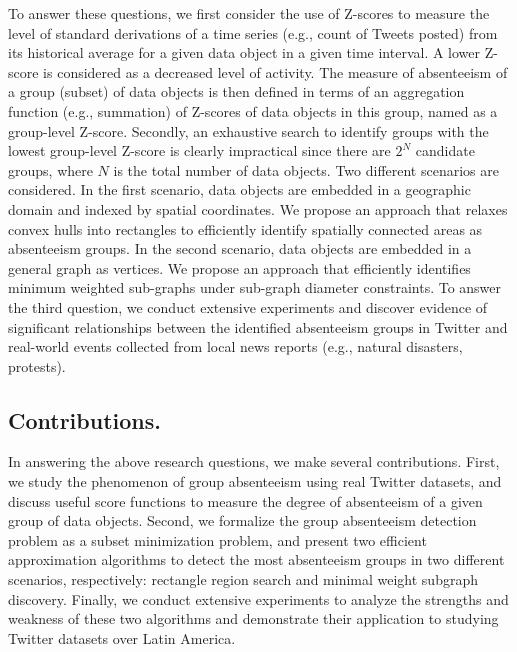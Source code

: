 To answer these questions, we first consider the use
of Z-scores to measure the level of standard derivations of a time
series
(e.g., count of Tweets posted)
from its historical average for a given data object
in a given time interval. A lower Z-score is considered as a decreased level of activity. The
measure of absenteeism of a group (subset) of data objects is then defined in terms
of an aggregation function (e.g., summation) of Z-scores of data objects in this group, named as a
group-level Z-score. Secondly, an exhaustive search to identify groups with the lowest group-level Z-score is clearly impractical since there are $2^N$ candidate groups, where $N$ is the total number of data objects. Two different scenarios are considered. In the first scenario, data objects are embedded in a geographic domain and indexed by spatial coordinates. We propose an approach that relaxes convex hulls into rectangles to efficiently identify spatially connected areas as absenteeism groups. In the second scenario, data objects are embedded in a general graph as vertices. We propose an approach that efficiently identifies minimum weighted sub-graphs under sub-graph diameter constraints. To answer the third question, we conduct extensive experiments and discover evidence of significant relationships between the identified absenteeism groups in Twitter and real-world events collected from local news reports (e.g., natural disasters, protests).

\subsection*{Contributions.}
In answering the above research questions, we make several contributions. First, we study the phenomenon of group absenteeism using real Twitter datasets, and discuss useful score functions to measure the degree of absenteeism of a given group of data objects. Second, we formalize the group absenteeism detection problem as a subset minimization problem, and present two efficient approximation algorithms to detect the most absenteeism groups in two different scenarios, respectively: rectangle region search and minimal weight subgraph discovery. Finally, we conduct extensive experiments to analyze the strengths and weakness of these two algorithms and demonstrate their application to studying Twitter datasets over Latin America.


